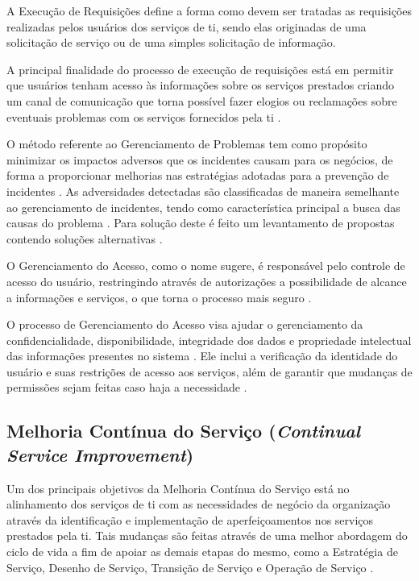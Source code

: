 A Execução de Requisições define a forma como devem ser tratadas as requisições realizadas pelos usuários dos serviços de \acrshort{ti}, sendo elas originadas
de uma solicitação de serviço ou de uma simples solicitação de informação\cite{abreu2012implantando}.

A principal finalidade do processo de execução de requisições está em permitir que usuários tenham acesso às informações sobre os serviços prestados criando um canal de comunicação que torna possível fazer elogios ou reclamações sobre eventuais problemas com os serviços fornecidos pela \acrshort{ti} \cite{introductoryoverviewofitil}.

O método referente ao Gerenciamento de Problemas tem como propósito minimizar os impactos adversos que os incidentes causam para os negócios, de forma a proporcionar melhorias nas estratégias adotadas para a prevenção de incidentes \cite{abreu2012implantando}. As adversidades detectadas são classificadas de maneira semelhante ao gerenciamento de incidentes, tendo como característica principal a busca das causas do problema \cite{introductoryoverviewofitil}. Para solução deste é feito um levantamento de propostas contendo soluções alternativas \cite{introductoryoverviewofitil, serviceoperation}.

O Gerenciamento do Acesso, como o nome sugere, é responsável pelo controle de acesso do usuário, restringindo através de autorizações a possibilidade de alcance a informações e serviços, o que torna o processo mais seguro \cite{abreu2012implantando}.

O processo de Gerenciamento do Acesso visa ajudar o gerenciamento da confidencialidade, disponibilidade, integridade dos dados e propriedade intelectual das informações presentes no sistema \cite{introductoryoverviewofitil}. Ele inclui a verificação da identidade do usuário e suas restrições de acesso aos serviços, além de garantir que mudanças de permissões sejam feitas caso haja a necessidade \cite{introductoryoverviewofitil}.

\subsection*{Melhoria Contínua do Serviço (\textit{Continual Service Improvement})}

\noindent Um dos principais objetivos da Melhoria Contínua do Serviço está no alinhamento dos serviços de \acrshort{ti} com as necessidades de negócio da organização através da identificação e implementação de aperfeiçoamentos nos serviços prestados pela \acrshort{ti}. Tais mudanças são feitas através de uma melhor abordagem do ciclo de vida a fim de apoiar as demais etapas do mesmo, como a Estratégia de Serviço, Desenho de Serviço, Transição de Serviço e Operação de Serviço \cite{continualserviceimprovement}.

